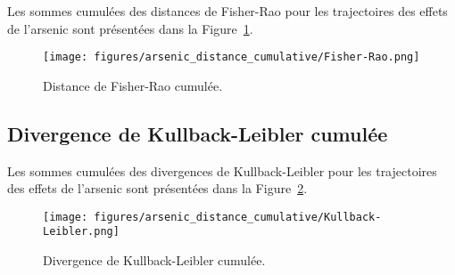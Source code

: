 Les sommes cumulées des distances de Fisher-Rao pour les trajectoires des effets de l'arsenic sont présentées dans la Figure~\ref{fig:arsenic_distance_cumulative-Fisher-Rao}.

\begin{figure}[H]
	\centering
	\texttt{[image: figures/arsenic\_distance\_cumulative/Fisher-Rao.png]}
	\caption{Distance de Fisher-Rao cumulée.}
	\label{fig:arsenic_distance_cumulative-Fisher-Rao}
\end{figure}

\subsection{Divergence de Kullback-Leibler cumulée}

Les sommes cumulées des divergences de Kullback-Leibler pour les trajectoires des effets de l'arsenic sont présentées dans la Figure~\ref{fig:arsenic_distance_cumulative-Kullback-Leibler}.

\begin{figure}[H]
	\centering
	\texttt{[image: figures/arsenic\_distance\_cumulative/Kullback-Leibler.png]}
	\caption{Divergence de Kullback-Leibler cumulée.}
	\label{fig:arsenic_distance_cumulative-Kullback-Leibler}
\end{figure}